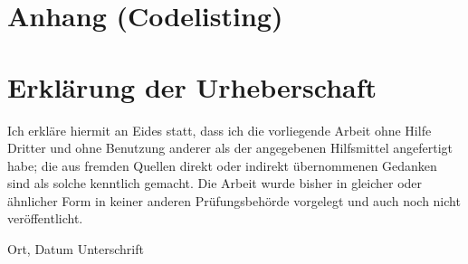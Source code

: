 \documentclass[12pt]{article}
\begin{document}
\newpage
\section{Anhang (Codelisting)} \label{sec:Anhang}

\newpage
\section{Erklärung der Urheberschaft}

Ich erkläre hiermit an Eides statt, dass ich die vorliegende Arbeit
ohne Hilfe Dritter und ohne Benutzung anderer als der angegebenen
Hilfsmittel angefertigt habe; die aus fremden Quellen direkt oder
indirekt übernommenen Gedanken sind als solche kenntlich gemacht. Die
Arbeit wurde bisher in gleicher oder ähnlicher Form in keiner anderen
Prüfungsbehörde vorgelegt und auch noch nicht veröffentlicht.

\vspace{4cm}

\hspace{2cm} Ort, Datum \hfill Unterschrift \hspace{2cm}
\newpage
\printbibliography
\end{document}
